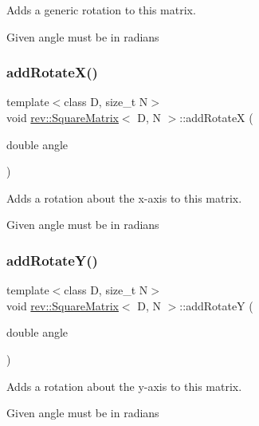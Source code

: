 Adds a generic rotation to this matrix. 

Given angle must be in radians \mbox{\label{classrev_1_1_square_matrix_ab075a9f62334836786c4c7fd564cb111}} 
\subsubsection{\texorpdfstring{addRotateX()}{addRotateX()}}
{\footnotesize\ttfamily template$<$class D, size\+\_\+t N$>$ \\
void \mbox{\hyperlink{classrev_1_1_square_matrix}{rev\+::\+Square\+Matrix}}$<$ D, N $>$\+::add\+RotateX (\begin{DoxyParamCaption}\item[{double}]{angle }\end{DoxyParamCaption})\hspace{0.3cm}{\ttfamily [inline]}}



Adds a rotation about the x-\/axis to this matrix. 

Given angle must be in radians \mbox{\label{classrev_1_1_square_matrix_a9a9cacfafa0279bbaec44b5ee50540ea}} 
\subsubsection{\texorpdfstring{addRotateY()}{addRotateY()}}
{\footnotesize\ttfamily template$<$class D, size\+\_\+t N$>$ \\
void \mbox{\hyperlink{classrev_1_1_square_matrix}{rev\+::\+Square\+Matrix}}$<$ D, N $>$\+::add\+RotateY (\begin{DoxyParamCaption}\item[{double}]{angle }\end{DoxyParamCaption})\hspace{0.3cm}{\ttfamily [inline]}}



Adds a rotation about the y-\/axis to this matrix. 

Given angle must be in radians \mbox{\label{classrev_1_1_square_matrix_a736616e6187a63102d6274bda61802ab}} 
